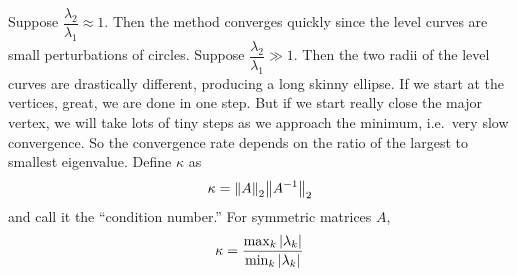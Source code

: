 \documentclass{article}
\begin{document}
    Suppose $\dfrac{\lambda_2}{\lambda_1} \approx 1$.  Then the method converges quickly since the level curves are small perturbations of circles.  Suppose $\dfrac{\lambda_2}{\lambda_1} \gg 1$.  Then the two radii of the level curves are drastically different, producing a long skinny ellipse.  If we start at the vertices, great, we are done in one step.  But if we start really close the major vertex, we will take lots of tiny steps as we approach the minimum, i.e.~very slow convergence.  So the convergence rate depends on the ratio of the largest to smallest eigenvalue.  Define $\kappa$ as
    \begin{align}
        \kappa = \norm{A}_2\norm{A^{-1}}_2
    \end{align}
    and call it the ``condition number.''  For symmetric matrices $A$,
    \begin{align}
        \kappa = \frac{\max_k \abs{\lambda_k}}{\min_k \abs{\lambda_k}}
    \end{align}
\end{document}
